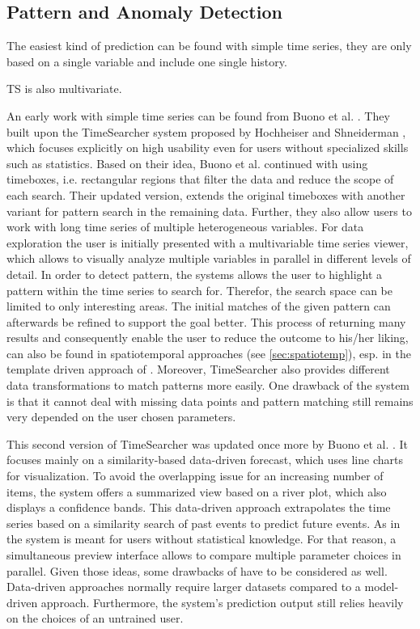 \documentclass[electronic]{vgtc}             %
\begin{document}
\subsection{Pattern and Anomaly Detection\label{subsec:pattern}}
The easiest kind of prediction can be found with simple time series, they are only based on a single variable and include one single history. 

TS is also multivariate.




An early work with simple time series can be found from Buono et al. \cite{buono:2005}.
They built upon the TimeSearcher system proposed by Hochheiser and Shneiderman \cite{Hochheiser:2004}, which focuses explicitly on high usability even for users without specialized skills such as statistics.
Based on their idea, Buono et al. continued with using timeboxes, i.e. rectangular regions that filter the data and reduce the scope of each search.
Their updated version, extends the original timeboxes with another variant for pattern search in the remaining data. 
Further, they also allow users to work with long time series of multiple heterogeneous variables. 
For data exploration the user is initially presented with a multivariable time series viewer, which allows to visually analyze multiple variables in parallel in different levels of detail.
In order to detect pattern, the systems allows the user to highlight a pattern within the time series to search for. 
Therefor, the search space can be limited to only interesting areas.
The initial matches of the given pattern can afterwards be refined to support the goal better. 
This process of returning many results and consequently enable the user to reduce the outcome to his/her liking, can also be found in spatiotemporal approaches (see \autoref{sec:spatiotemp}), esp. in the template driven approach of \cite{malik:2014}.
Moreover, TimeSearcher also provides different data transformations to match patterns more easily. 
One drawback of the system is that it cannot deal with missing data points and pattern matching still remains very depended on the user chosen parameters.

This second version of TimeSearcher was updated once more by Buono et al. \cite{buono:2007}.
It focuses mainly on a similarity-based data-driven forecast, which uses line charts for visualization.
To avoid the overlapping issue for an increasing number of items, the system offers a summarized view based on a river plot, which also displays a confidence bands.
This data-driven approach extrapolates the time series based on a similarity search of past events to predict future events. 
As in \cite{buono:2005} the system is meant for users without statistical knowledge.
For that reason, a simultaneous preview interface allows to compare multiple parameter choices in parallel. 
Given those ideas, some drawbacks of have to be considered as well. 
Data-driven approaches normally require larger datasets compared to a model-driven approach.
Furthermore, the system's prediction output still relies heavily on the choices of an untrained user.
\end{document}
